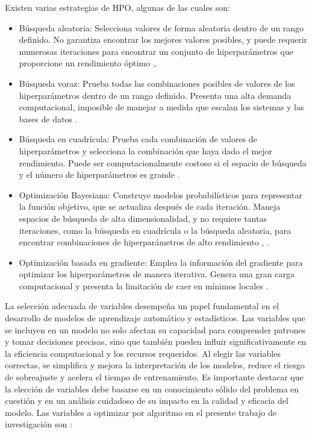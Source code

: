 Existen varias estrategias de HPO, algunas de las cuales son:
\begin{itemize}
	\item Búsqueda aleatoria: Selecciona valores de forma aleatoria dentro de un rango definido. No garantiza encontrar los mejores valores posibles, y puede requerir numerosas iteraciones para encontrar un conjunto de hiperparámetros que proporcione un rendimiento óptimo \citep{geron2022hands},\citep{zoller2021benchmark}.
	\item Búsqueda voraz: Prueba todas las combinaciones posibles de valores de los hiperparámetros dentro de un rango definido. Presenta una alta demanda computacional, imposible de manejar a medida que escalan los sistemas y las bases de datos \citep{zoller2021benchmark}.
	\item Búsqueda en cuadrícula: Prueba cada combinación de valores de hiperparámetros y selecciona la combinación que haya dado el mejor rendimiento. Puede ser computacionalmente costoso si el espacio de búsqueda y el número de hiperparámetros es grande \citep{he2021automl}.
	\item Optimización Bayesiana: Construye modelos probabilísticos para representar la función objetivo, que se actualiza después de cada iteración. Maneja espacios de búsqueda de alta dimensionalidad, y no requiere tantas iteraciones, como la búsqueda en cuadrícula o la búsqueda aleatoria, para encontrar combinaciones de hiperparámetros de alto rendimiento \citep{hutter2019automated}, \citep{he2021automl}.
	\item Optimización basada en gradiente: Emplea la información del gradiente para optimizar los hiperparámetros de manera iterativa. Genera una gran carga computacional y presenta la limitación de caer en mínimos locales \citep{zoller2021benchmark}.
\end{itemize} 
La selección adecuada de variables desempeña un papel fundamental en el desarrollo de modelos de aprendizaje automático y estadísticos. Las variables que se incluyen en un modelo no solo afectan su capacidad para comprender patrones y tomar decisiones precisas, sino que también pueden influir significativamente en la eficiencia computacional y los recursos requeridos. Al elegir las variables correctas, se simplifica y mejora la interpretación de los modelos, reduce el riesgo de sobreajuste y acelera el tiempo de entrenamiento. Es importante destacar que la elección de variables debe basarse en un conocimiento sólido del problema en cuestión y en un análisis cuidadoso de su impacto en la calidad y eficacia del modelo. Las variables a optimizar por algoritmo en el presente trabajo de investigación son \citep{scholkopf2018learning}:
